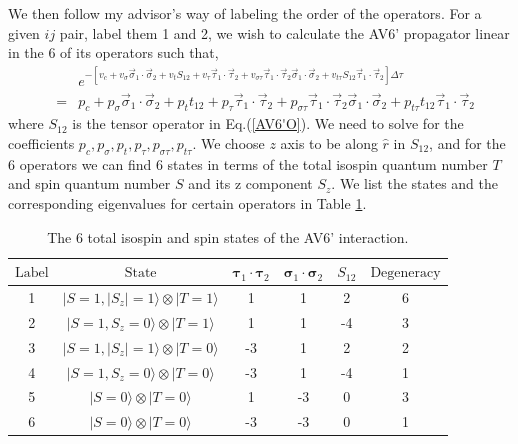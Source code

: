 \documentclass[12pt,letterpaper,UTF8]{report}
\begin{document}
{We then follow my advisor's way of labeling the order of the operators.
For a given $ij$ pair, label them 1 and 2, we wish to calculate the AV6' propagator linear in the 6 of its operators such that,
\begin{eqnarray}
&& e^{- \left[
v_c + v_\sigma \vec \sigma_1 \cdot \vec \sigma_2
+ v_t S_{12}
+ v_\tau \vec \tau_1 \cdot \vec \tau_2
+ v_{\sigma \tau} \vec \tau_1 \cdot \vec \tau_2 \vec \sigma_1 \cdot \vec\sigma_2
+v_{t \tau} S_{12} \vec \tau_1 \cdot \vec \tau_2
\right] \Delta \tau}
\nonumber\\
&=&
p_c + p_\sigma \vec \sigma_1 \cdot \vec \sigma_2
+ p_t t_{12}
+ p_\tau \vec \tau_1 \cdot \vec \tau_2
+ p_{\sigma \tau} \vec \tau_1 \cdot \vec \tau_2 \vec \sigma_1 \cdot \vec\sigma_2
+p_{t \tau} t_{12} \vec \tau_1 \cdot \vec\tau_2
\label{av6linearizing}
\end{eqnarray}
where $S_{12}$ is the tensor operator in Eq.(\ref{AV6'O}).
We need to solve for the coefficients $p_c, p_\sigma, p_t, p_\tau, p_{\sigma \tau}, p_{t \tau}$.
We choose $z$ axis to be along $\hat r$ in $S_{12}$, and for the 6 operators we can find 6 states in terms of the total isospin quantum number $T$ and spin quantum number $S$ and its z component $S_z$. We list the states and the corresponding eigenvalues for certain operators in Table \ref{Table6statesAV6'}.
\begin{table}[tbhp!]
\caption[The 6 Total Isospin and Spin States of the AV6' Interaction]{The 6 total isospin and spin states of the AV6' interaction.}
\label{Table6statesAV6'}%
\begin{tabular*}{1.0\textwidth}{@{\extracolsep{\fill}}cccccc}
\toprule
$\textrm{Label}$ & $\textrm{State}$ & $\bm{\tau}_1 \cdot \bm{\tau}_2$  &  $\bm{\sigma}_1 \cdot \bm{\sigma}_2$ &  $S_{12}$ &
$\textrm{Degeneracy}$ \\ \midrule
1 & $|S=1, |S_z|=1 \rangle \otimes | T=1 \rangle$ & 1 & 1 & 2 & 6 \\ [\smallskipamount]
2 & $| S=1, S_z=0\rangle \otimes | T=1 \rangle$  & 1 & 1 & -4 & 3\\ [\smallskipamount]
3 & $|S=1, |S_z|=1 \rangle \otimes | T=0 \rangle$ & -3 & 1 & 2 & 2 \\ [\smallskipamount]
4 & $| S=1, S_z=0\rangle \otimes | T=0 \rangle$  & -3 & 1 & -4 & 1 \\ [\smallskipamount]
5 & $|S=0 \rangle \otimes | T=0 \rangle$ & 1 & -3 & 0 & 3\\ [\smallskipamount]
6 & $|S=0 \rangle \otimes | T=0 \rangle$ & -3 & -3 & 0 & 1 \\
\bottomrule
\end{tabular*}
\end{table}






}
\end{document}

